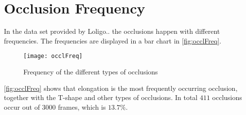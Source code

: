 \section{Occlusion Frequency}
In the data set provided by Loligo.. the occlusions happen with different frequencies. The frequencies are displayed in a bar chart in \autoref{fig:occlFreq}.

\begin{figure}[H]
	\centering
	\texttt{[image: occlFreq]}
	\caption{Frequency of the different types of occlusions}
	\label{fig:occlFreq}
\end{figure}

\autoref{fig:occlFreq} shows that elongation is the most frequently occurring occlusion, together with the T-shape and other types of occlusions. In total $ 411 $ occlusions occur out of $ 3000 $ frames, which is $13.7\%$.
